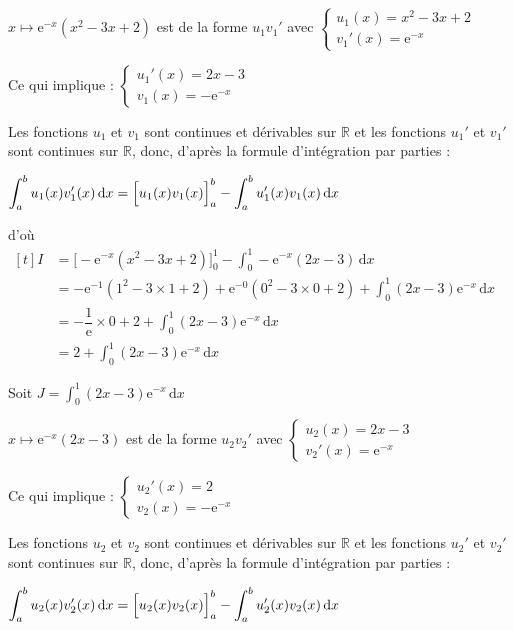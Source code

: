 \documentclass[10pt]{article}
\providecommand{\R}{\mathbb{R}}
\providecommand{\e}{{\mathrm{e}}}
\renewcommand{\d}{{\mathrm{d}}}
\begin{document}
\begin{enumerate}
\begin{enumerate}
			$x \longmapsto \e^{-x}\left(x^{2}-3 x+2\right) $ \quad est de la forme $u_1 v_1'$ avec \quad $\begin{cases}u_1(x)=x^{2}-3 x+2 \\ v_1'(x)= \e^{-x}\end{cases}$

			Ce qui implique : \quad $\begin{cases}u_1'(x)=2x-3 \\v_1(x)=-\e^{-x} \end{cases}$

			Les fonctions $u_1$ et $v_1$ sont continues et dérivables sur $\R$ et les fonctions $u_1'$ et $v_1'$ sont continues sur $\R$, donc, d'après la formule d'intégration par parties :

			$\displaystyle \int_{a}^{b} u_1(x)v_1'(x)\,    \d x= \Big [ u_1(x)v_1(x)\strut\Big]_{a}^{b} - \int_{a}^{b} u_1'(x)v_1(x) \, \mathrm{d}x$\

			d'où $
			\begin{aligned}[t]
				I & =\Big[ -\e^{-x}\left(x^{2}-3 x+2\right)   \Big]_0^{1}-\int_0^{1}   -\e^{-x}(2x-3) \,    \d x\\
				& =   -\e^{-1}\left(1^{2}-3 \times 1+2\right) + \e^{-0}\left(0^{2}-3 \times 0+2\right)    +\int_0^{1}(2x-3)\e^{-x}\,    \d x\\
				& =   -\dfrac{1}{\e} \times 0 +2 +\int_0^{1}(2x-3)\e^{-x}\,    \d x\\
				& =  2 +\int_0^{1}(2x-3)\e^{-x}\,    \d x
			\end{aligned}	$


			Soit $\displaystyle J= \int_0^{1}(2x-3)\e^{-x}\, \d x $

			$x \longmapsto \e^{-x}\left(2 x-3\right) $ \quad est de la forme $u_2 v_2'$ avec \quad $\begin{cases}u_2(x)=2x-3 \\ v_2'(x)= \e^{-x}\end{cases}$

			Ce qui implique : \quad $\begin{cases}u_2'(x)=2 \\v_2(x)=-\e^{-x} \end{cases}$

			Les fonctions $u_2$ et $v_2$ sont continues et dérivables sur $\R$ et les fonctions $u_2'$ et $v_2'$ sont continues sur $\R$, donc, d'après la formule d'intégration par parties :

			$\displaystyle \int_{a}^{b} u_2(x)v_2'(x)\,    \d x= \Big [ u_2(x)v_2(x)\strut\Big]_{a}^{b} - \int_{a}^{b} u_2'(x)v_2(x) \, \mathrm{d}x$\


\end{enumerate}
\end{enumerate}
\end{document}
